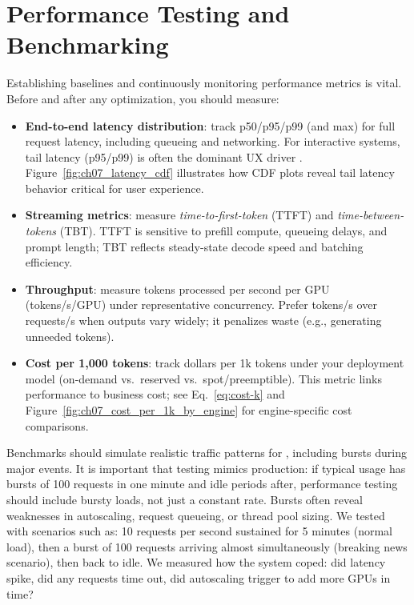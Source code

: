 \FloatBarrier
\section{Performance Testing and Benchmarking}
\label{sec:perf-benchmark}
Establishing baselines and continuously monitoring performance metrics is vital. Before and after any optimization, you should measure:
\begin{itemize}
\item \textbf{End-to-end latency distribution}: track p50/p95/p99 (and max) for full request latency, including queueing and networking. For interactive systems, tail latency (p95/p99) is often the dominant UX driver \cite{Dean2013Tail}. Figure~\ref{fig:ch07_latency_cdf} illustrates how CDF plots reveal tail latency behavior critical for user experience.
\item \textbf{Streaming metrics}: measure \emph{time-to-first-token} (TTFT) and \emph{time-between-tokens} (TBT). TTFT is sensitive to prefill compute, queueing delays, and prompt length; TBT reflects steady-state decode speed and batching efficiency.
\item \textbf{Throughput}: measure tokens processed per second per GPU (tokens/s/GPU) under representative concurrency. Prefer tokens/s over requests/s when outputs vary widely; it penalizes waste (e.g., generating unneeded tokens).
\item \textbf{Cost per 1,000 tokens}: track dollars per 1k tokens under your deployment model (on-demand vs.\ reserved vs.\ spot/preemptible). This metric links performance to business cost; see Eq.~\eqref{eq:cost-k} and Figure~\ref{fig:ch07_cost_per_1k_by_engine} for engine-specific cost comparisons.
\end{itemize}

Benchmarks should simulate realistic traffic patterns for \ishtar{}, including bursts during major events. It is important that testing mimics production: if typical usage has bursts of 100 requests in one minute and idle periods after, performance testing should include bursty loads, not just a constant rate. Bursts often reveal weaknesses in autoscaling, request queueing, or thread pool sizing. We tested \ishtar{} with scenarios such as: 10 requests per second sustained for 5 minutes (normal load), then a burst of 100 requests arriving almost simultaneously (breaking news scenario), then back to idle. We measured how the system coped: did latency spike, did any requests time out, did autoscaling trigger to add more GPUs in time?

